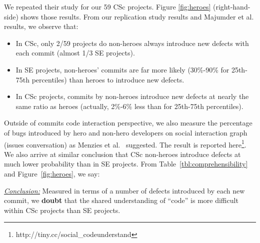 \documentclass[conference,10pt]{IEEEtran}
\newcommand{\bi}{\begin{itemize}}
\newcommand{\ei}{\end{itemize}}
\newenvironment{RQ}{\vspace{1mm}\begin{tcolorbox}[enhanced,width=3.4in,size=fbox,colback=red!5!white,drop shadow southeast,sharp corners]}{\end{tcolorbox}}
\begin{document}
We repeated their study for our 59 CSc projects.  Figure \ref{fig:heroes} (right-hand-side)
shows those results. 
From our replication study results and Majumder et al.  results, we observe that:
\bi
\item In CSc, only 2/59 projects do non-heroes always introduce new defects with each commit (almost 1/3 SE projects).
\item In SE projects, non-heroes' commits are far more likely (30\%-90\% for 25th-75th percentiles) than heroes to introduce new defects.
\item In CSc projects, commits by non-heroes introduce new defects at nearly the same ratio as heroes (actually, 2\%-6\% less than for 25th-75th percentiles).
\ei
 
Outside of commits code interaction perspective, we also measure the percentage of bugs introduced by hero and non-hero developers on social interaction graph (issues conversation) as Menzies et al.~\cite{majumder19_heroes} suggested. The result is reported here\footnote{http://tiny.cc/social\_codeunderstand}. We also arrive at similar conclusion that CSc non-heroes introduce defects at much lower probability than in SE projects. 
From Table~\ref{tbl:comprehensibility} and Figure~\ref{fig:heroes}, we say:

\begin{RQ}
\textit{\underline{Conclusion:}} Measured in terms
of a number of defects introduced by each new commit, we \textbf{doubt} that the shared understanding of ``code'' is more difficult within  CSc projects than SE projects.
\end{RQ}



\end{document}
